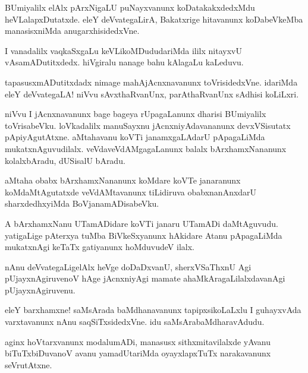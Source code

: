 \documentclass{article}
\begin{document}
\begin{mn}
BUmiyalilx elAlx pArxNigaLU puNayxvanunx koDatakakxdedxMdu
heVLalapxDutatxde. eleY deVvategaLirA, Bakatxrige hitavanunx
koDabeVkeMba manasisxniMda anugarxhisidedxVne.
\end{mn}

\begin{mn}%
I vanadalilx vaqkaSxgaLu keVLikoMDududariMda ililx nitayxvU
vAsamADutitxdedx. hiVgiralu nanage bahu kAlagaLu kaLeduvu.
\end{mn}

\begin{mn}
tapasusxmADutitxdadx nimage mahAjAcnxnavanunx toVrisidedxVne. idariMda
eleY deVvategaLA! niVvu sAvxthaRvanUnx, parAthaRvanUnx sAdhisi koLiLxri.
\end{mn}

\begin{mn}
niVvu I jAcnxnavanunx bage bageya rUpagaLanunx dharisi BUmiyalilx
toVrisabeVku. loVkadalilx manuSayxnu jAcnxniyAdavananunx devxVSisutatx
pApiyAgutAtxne. aMtahavanu koVTi janamxgaLAdarU pApagaLiMda
mukatxnAguvudilalx. veVdaveVdAMgagaLanunx balalx bArxhamxNananunx
kolalxbAradu, dUSisalU bAradu.
\end{mn}

\begin{mn}
aMtaha obabx bArxhamxNananunx koMdare koVTe janaranunx
koMdaMtAgutatxde veVdAMtavanunx tiLidiruva obabxnanAnxdarU
sharxdedhxyiMda BoVjanamADisabeVku.
\end{mn}

\begin{mn}%
A bArxhamxNanu UTamADidare koVTi janaru UTamADi
daMtAguvudu. yatigaLige pAterxya tuMba BiVkeSxyanunx hAkidare Atanu
pApagaLiMda mukatxnAgi keTaTx gatiyanunx hoMduvudeV ilalx.
\end{mn}

\begin{mn}
nAnu deVvategaLigelAlx heVge doDaDxvanU, sherxVSaThxnU Agi
pUjayxnAgiruvenoV hAge jAcnxniyAgi mamate ahaMkAragaLilalxdavanAgi pUjayxnAgiruvenu.
\end{mn}

\begin{mn}
eleY barxhamxne! saMsArada baMdhanavanunx tapipxsikoLaLxlu I
guhayxvAda varxtavanunx nAnu saqSiTxsidedxVne. idu saMsArabaMdharavAdudu.
\end{mn}

\begin{mn}
aginx hoVtarxvanunx modalumADi, manasusx sithxmitavilalxde yAvanu
biTuTxbiDuvanoV avanu yamadUtariMda oyayxlapxTuTx narakavanunx seVrutAtxne.
\end{mn}
\end{document}
